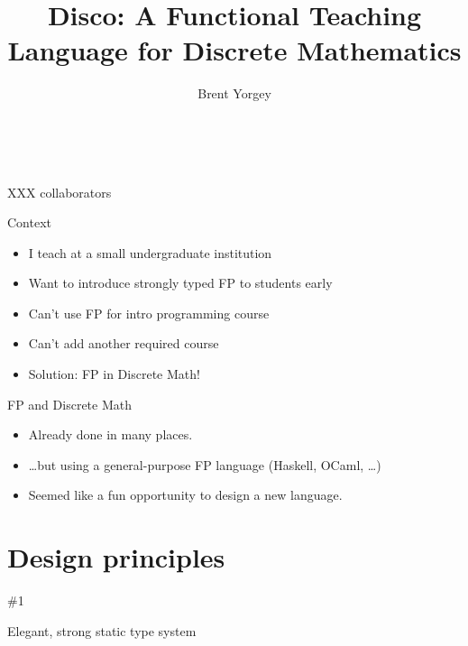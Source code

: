 \documentclass[xcolor=svgnames,12pt,aspectratio=169]{beamer}
\title{Disco: A Functional Teaching Language for Discrete Mathematics}
\date{\theschool \\ \thedate}
\author{Brent Yorgey}
\newenvironment{xframe}[1][]
  {\begin{frame}[fragile,environment=xframe,#1]}
  {\end{frame}}
\begin{document}
\begin{xframe}{}
   \titlepage
\end{xframe}

\begin{xframe}{}
  XXX collaborators
\end{xframe}

\begin{xframe}{Context}
  \begin{itemize}
  \item<+-> I teach at a small undergraduate institution
  \item<+-> Want to introduce strongly typed FP to students early
  \item<+-> Can't use FP for intro programming course
  \item<+-> Can't add another required course
  \item<+-> Solution: FP in Discrete Math!
  \end{itemize}
\end{xframe}

\begin{xframe}{FP and Discrete Math}
  \begin{itemize}
  \item<+-> Already done in many places.
  \item<+-> \dots but using a general-purpose FP language (Haskell,
    OCaml, \dots)
  \item<+-> Seemed like a fun opportunity to design a new language.
  \end{itemize}
\end{xframe}


\section{Design principles}


\begin{xframe}
  \begin{center}
    {\Large \#1} \bigskip

    {\Large Elegant, strong static type system}
  \end{center}

\end{xframe}
\end{document}
